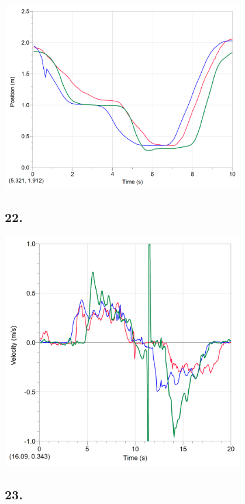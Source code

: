     \begin{mdframed}
        \centering\includegraphics[width=0.8\textwidth]{image27.png}
    \end{mdframed}

    \subsection*{22.}

    \begin{mdframed}
        \centering\includegraphics[width=0.8\textwidth]{image19.png}
    \end{mdframed}

    \subsection*{23.}

